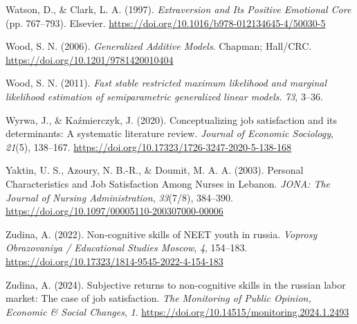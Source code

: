 \documentclass[
]{interact}
\newlength{\cslhangindent}
\newenvironment{CSLReferences}[2] %
 {\begin{list}{}{%
  \setlength{\itemindent}{0pt}
  \setlength{\leftmargin}{0pt}
  \setlength{\parsep}{0pt}
  \ifodd #1
   \setlength{\leftmargin}{\cslhangindent}
   \setlength{\itemindent}{-1\cslhangindent}
  \fi
  \setlength{\itemsep}{#2\baselineskip}}}
 {\end{list}}
\begin{document}
\begin{CSLReferences}{1}{0}
Watson, D., \& Clark, L. A. (1997). \emph{Extraversion and Its Positive
Emotional Core} (pp. 767--793). Elsevier.
\url{https://doi.org/10.1016/b978-012134645-4/50030-5}

Wood, S. N. (2006). \emph{Generalized Additive Models}. Chapman;
Hall/CRC. \url{https://doi.org/10.1201/9781420010404}

Wood, S. N. (2011). \emph{Fast stable restricted maximum likelihood and
marginal likelihood estimation of semiparametric generalized linear
models}. \emph{73}, 3--36.

Wyrwa, J., \& Kaźmierczyk, J. (2020). Conceptualizing job satisfaction
and its determinants: A systematic literature review. \emph{Journal of
Economic Sociology}, \emph{21}(5), 138--167.
\url{https://doi.org/10.17323/1726-3247-2020-5-138-168}

Yaktin, U. S., Azoury, N. B.-R., \& Doumit, M. A. A. (2003). Personal
Characteristics and Job Satisfaction Among Nurses in Lebanon.
\emph{JONA: The Journal of Nursing Administration}, \emph{33}(7/8),
384--390. \url{https://doi.org/10.1097/00005110-200307000-00006}

Zudina, A. (2022). Non-cognitive skills of NEET youth in russia.
\emph{Voprosy Obrazovaniya / Educational Studies Moscow}, \emph{4},
154--183. \url{https://doi.org/10.17323/1814-9545-2022-4-154-183}

Zudina, A. (2024). Subjective returns to non-cognitive skills in the
russian labor market: The case of job satisfaction. \emph{The Monitoring
of Public Opinion, Economic \& Social Changes}, \emph{1}.
\url{https://doi.org/10.14515/monitoring.2024.1.2493}

\end{CSLReferences}
\end{document}

